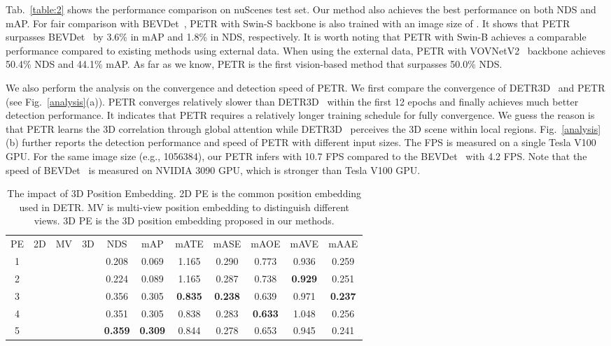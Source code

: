 \documentclass[runningheads]{llncs}
\begin{document}
Tab.~\ref{table:2} shows the performance comparison on nuScenes test set. Our method also achieves the best performance on both NDS and mAP.
For fair comparison with BEVDet~\cite{huang2021bevdet}, PETR with Swin-S backbone is also trained with an image size of  . It shows that PETR surpasses BEVDet~\cite{huang2021bevdet} by 3.6\% in mAP and 1.8\% in NDS, respectively. It is worth noting that PETR with Swin-B achieves a comparable performance compared to existing methods using external data. 
When using the external data, PETR with VOVNetV2~\cite{lee2020centermask} backbone achieves 50.4\% NDS and 44.1\% mAP. As far as we know, PETR is the first vision-based method that surpasses 50.0\% NDS.

We also perform the analysis on the convergence and detection speed of PETR. We first compare the convergence of DETR3D~\cite{wang2022detr3d} and PETR (see Fig.~\ref{analysis}(a)). PETR converges relatively slower than DETR3D~\cite{wang2022detr3d} within the first 12 epochs and finally achieves much better detection performance. It indicates that PETR requires a relatively longer training schedule for fully convergence. We guess the reason is that PETR learns the 3D correlation through global attention while DETR3D~\cite{wang2022detr3d} perceives the 3D scene within local regions. Fig.~\ref{analysis}(b) further reports the detection performance and speed of PETR with different input sizes. The FPS is measured on a single Tesla V100 GPU. For the same image size (e.g., 1056384), our PETR infers with 10.7 FPS compared to the BEVDet~\cite{huang2021bevdet} with 4.2 FPS. Note that the speed of BEVDet~\cite{huang2021bevdet} is measured on NVIDIA 3090 GPU, which is stronger than Tesla V100 GPU.
\begin{table}[t]
    \begin{center}
    \caption{The impact of 3D Position Embedding. 2D PE is the common position embedding used in DETR. MV is multi-view  position embedding to distinguish different views. 3D PE is the 3D position embedding proposed in our methods.}
    \label{table:3}
    \begin{tabular}{c|ccc|ccccccc}
        \hline\noalign{\smallskip}
        PE & 2D & MV & 3D& NDS & mAP  & mATE & mASE & mAOE & mAVE & mAAE\\
        \noalign{\smallskip}
        \hline
        \noalign{\smallskip}
        1&& & &0.208 &0.069 &1.165 &0.290 &0.773 &0.936 &0.259\\
        2& && &0.224 &0.089 &1.165 &0.287 &0.738 &\textbf{0.929} &0.251 \\
        3& & &&0.356 &0.305 &\textbf{0.835} &\textbf{0.238} &0.639 &0.971 &\textbf{0.237} \\
        4&& &&0.351 &0.305 &0.838 &0.283 &\textbf{0.633} &1.048 &0.256 \\
        5&&&&\textbf{0.359} &\textbf{0.309} &0.844 &0.278 &0.653 &0.945 &0.241 \\
        \hline
        \end{tabular}
    \label{tab:array}
\end{center}
\end{table}
\end{document}
